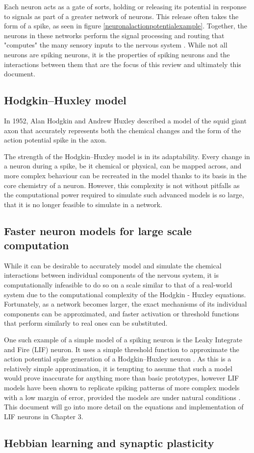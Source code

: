 Each neuron acts as a gate of sorts, holding or releasing its potential in
response to signals as part of a greater network of neurons. This release often
takes the form of a spike, as seen in figure \ref{neuronalactionpotentialexample}.
Together, the neurons in these networks perform the signal processing and
routing that "computes" the many sensory inputs to the nervous system
\autocite{koch_biophysics_2004}. While not all neurons are spiking neurons, it
is the properties of spiking neurons and the interactions between them that are
the focus of this review and ultimately this document.

\subsection{Hodgkin–Huxley model}

In 1952, Alan Hodgkin and Andrew Huxley described a model of the squid giant
axon that accurately represents both the chemical changes and the form of the
action potential spike in the axon. \autocite{hodgkin_quantitative_1952}

The strength of the Hodgkin–Huxley model is in its adaptability. Every change in
a neuron during a spike, be it chemical or physical, can be mapped across, and
more complex behaviour can be recreated in the model thanks to its basis in the
core chemistry of a neuron. However, this complexity is not without pitfalls as
the computational power required to simulate such advanced models is so large,  that it is no longer feasible to simulate in a network.

\subsection{Faster neuron models for large scale computation}

While it can be desirable to accurately model and simulate the chemical
interactions between individual components of the nervous system, it is
computationally infeasible to do so on a scale similar to that of a real-world
system due to the computational complexity of the Hodgkin - Huxley equations.
Fortunately, as a network becomes larger, the exact mechanisms of its individual
components can be approximated, and faster activation or threshold functions
that perform similarly to real ones can be substituted.

One such example of a simple model of a spiking neuron is the Leaky Integrate
and Fire (LIF) neuron. It uses a simple threshold function to approximate the
action potential spike generation of a Hodgkin–Huxley neuron
\autocite{trappenberg_fundamentals_2009}. As this is a relatively simple
approximation, it is tempting to assume that such a model would prove inaccurate
for anything more than basic prototypes, however LIF models have been shown to
replicate spiking patterns of more complex models with a low margin of error,
provided the models are under natural conditions
\autocite{teeter_generalized_2018}. This document will go into more detail on
the equations and implementation of LIF neurons in Chapter 3.

\subsection{Hebbian learning and synaptic plasticity}
